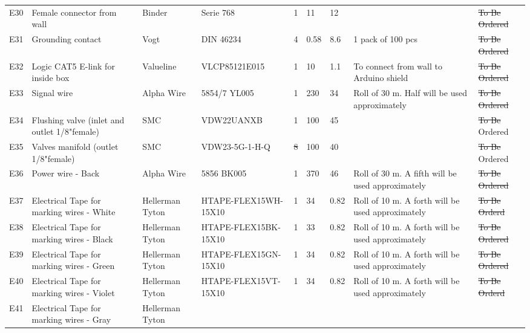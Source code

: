 \documentclass[a4paper,12pt,twoside]{article}
\providecommand{\DIFaddtex}[1]{{\protect\color{blue}\uwave{#1}}} %
\providecommand{\DIFdeltex}[1]{{\protect\color{red}\sout{#1}}}                      %
\providecommand{\DIFaddbegin}{} %
\providecommand{\DIFaddend}{} %
\providecommand{\DIFdelbegin}{} %
\providecommand{\DIFdelend}{} %
\providecommand{\DIFadd}[1]{\texorpdfstring{\DIFaddtex{#1}}{#1}} %
\providecommand{\DIFdel}[1]{\texorpdfstring{\DIFdeltex{#1}}{}} %
\newcommand{\DIFscaledelfig}{0.5}
\newlength{\DIFdelgraphicswidth} %
\newlength{\DIFdelgraphicsheight} %
\newcommand{\DIFaddincludegraphics}[2][]{{\color{blue}\fbox{\DIFOincludegraphics[#1]{#2}}}} %
\newcommand{\DIFdelincludegraphics}[2][]{%
\sbox{\DIFdelgraphicsbox}{\DIFOincludegraphics[#1]{#2}}%
\settoboxwidth{\DIFdelgraphicswidth}{\DIFdelgraphicsbox} %
\settoboxtotalheight{\DIFdelgraphicsheight}{\DIFdelgraphicsbox} %
\scalebox{\DIFscaledelfig}{%
\parbox[b]{\DIFdelgraphicswidth}{\usebox{\DIFdelgraphicsbox}\\[-\baselineskip] \rule{\DIFdelgraphicswidth}{0em}}\llap{\resizebox{\DIFdelgraphicswidth}{\DIFdelgraphicsheight}{%
\setlength{\unitlength}{\DIFdelgraphicswidth}%
\begin{picture}(1,1)%
\thicklines\linethickness{2pt} %
{\color[rgb]{1,0,0}\put(0,0){\framebox(1,1){}}}%
{\color[rgb]{1,0,0}\put(0,0){\line( 1,1){1}}}%
{\color[rgb]{1,0,0}\put(0,1){\line(1,-1){1}}}%
\end{picture}%
}\hspace*{3pt}}} %
} %
\DeclareRobustCommand{\DIFaddbegin}{\DIFOaddbegin \let\includegraphics\DIFaddincludegraphics} %
\DeclareRobustCommand{\DIFaddend}{\DIFOaddend \let\includegraphics\DIFOincludegraphics} %
\DeclareRobustCommand{\DIFdelbegin}{\DIFOdelbegin \let\includegraphics\DIFdelincludegraphics} %
\DeclareRobustCommand{\DIFdelend}{\DIFOaddend \let\includegraphics\DIFOincludegraphics} %
\begin{document}
\begin{landscape}
\begin{longtable} {|m{}|m{}|m{}|m{}|m{}|m{}|m{}|m{}|m{}|}
}\DIFdelend \DIFaddbegin \DIFadd{Received }\DIFaddend \\ \hline E30 & Female connector from wall & Binder & Serie 768 & 1 & 11 & 12 &  & \DIFdelbegin \DIFdel{To Be Ordered }\DIFdelend \DIFaddbegin \DIFadd{Received }\DIFaddend \\ \hline E31 & Grounding contact & Vogt & DIN 46234 & 4 & 0.58 & 8.6 & 1 pack of 100 pcs & \DIFdelbegin \DIFdel{To Be Ordered }\DIFdelend \DIFaddbegin \DIFadd{Received }\DIFaddend \\ \hline E32 & Logic CAT5 E-link for inside box & Valueline & VLCP85121E015 & 1 & 10 & 1.1 & To connect from wall to Arduino shield & \DIFdelbegin \DIFdel{To Be Ordered }\DIFdelend \DIFaddbegin \DIFadd{Received }\DIFaddend \\ \hline E33 & Signal wire & Alpha Wire & 5854/7 YL005 & 1 & 230 & 34 & Roll of 30 m. Half will be used approximately & \DIFdelbegin \DIFdel{To Be Ordered }\DIFdelend \DIFaddbegin \DIFadd{Received }\DIFaddend \\ \hline E34 & Flushing valve (inlet and outlet 1/8"\DIFaddbegin \DIFadd{" }\DIFaddend female) & SMC & VDW22UANXB & 1 & 100 & 45 &  & \DIFdelbegin \DIFdel{To Be }\DIFdelend Ordered \\ \hline E35 & Valves manifold (outlet 1/8"\DIFaddbegin \DIFadd{" }\DIFaddend female) & SMC & VDW23-5G-1-H-Q & \DIFdelbegin \DIFdel{8 }\DIFdelend \DIFaddbegin \DIFadd{6 }\DIFaddend & 100 & 40 &  & \DIFdelbegin \DIFdel{To Be }\DIFdelend Ordered \\ \hline E36 & Power wire - Back & Alpha Wire & 5856 BK005 & 1 & 370 & 46 & Roll of 30 m. A fifth will be used approximately & \DIFdelbegin \DIFdel{To Be Ordered }\DIFdelend \DIFaddbegin \DIFadd{Received }\DIFaddend \\ \hline E37 & Electrical Tape for marking wires - White & Hellerman Tyton & HTAPE-FLEX15WH-15X10 & 1 & 34 & 0.82 & Roll of 10 m. A forth will be used approximately & \DIFdelbegin \DIFdel{To Be Orderd }\DIFdelend \DIFaddbegin \DIFadd{Received }\DIFaddend \\ \hline E38 & Electrical Tape for marking wires - Black & Hellerman Tyton & HTAPE-FLEX15BK-15X10 & 1 & 33 & 0.82 & Roll of 10 m. A forth will be used approximately & \DIFdelbegin \DIFdel{To Be Ordered }\DIFdelend \DIFaddbegin \DIFadd{Received }\DIFaddend \\ \hline E39 & Electrical Tape for marking wires - Green & Hellerman Tyton & HTAPE-FLEX15GN-15X10 & 1 & 34 & 0.82 & Roll of 10 m. A forth will be used approximately & \DIFdelbegin \DIFdel{To Be Ordered }\DIFdelend \DIFaddbegin \DIFadd{Received }\DIFaddend \\ \hline E40 & Electrical Tape for marking wires - Violet & Hellerman Tyton & HTAPE-FLEX15VT-15X10 & 1 & 34 & 0.82 & Roll of 10 m. A forth will be used approximately & \DIFdelbegin \DIFdel{To Be Orderd }\DIFdelend \DIFaddbegin \DIFadd{Received }\DIFaddend \\ \hline E41 & Electrical Tape for marking wires - Gray & Hellerman Tyton & 
\end{longtable}
\end{landscape}
\end{document}
